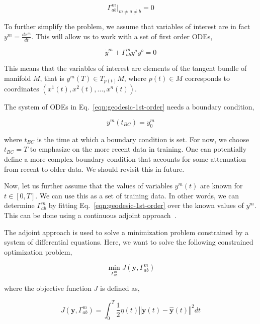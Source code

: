 \documentclass{article}
\begin{document}
\begin{equation}\label{eqn:gamma-diagonal-metric}
\Gamma^{m}_{ab}|_{m \ne a \ne b} = 0
\end{equation}

To further simplify the problem, we assume that variables of interest
are in fact $y^{m} = \frac{dx^{m}}{dt}$. This will allow us to work
with a set of first order ODEs,

\begin{equation}\label{eqn:geodesic-1st-order}
\dot{y}^{m} + \Gamma^{m}_{ab} y^{a} y^{b} = 0
\end{equation}

This means that the variables of interest are elements of the tangent
bundle of manifold $M$, that is $y^{m}(T) \in T_{p(t)}M$, where $p(t)
\in M$ corresponds to coordinates $(x^{1}(t),x^{2}(t),...,x^{n}(t))$.

The system of ODEs in Eq.~\ref{eqn:geodesic-1st-order} needs a
boundary condition,

\begin{equation}\label{eqn:geodesic-bc}
y^{m}(t_{BC}) = y^{m}_{0}
\end{equation}

where $t_{BC}$ is the time at which a boundary condition is set. For
now, we choose $t_{BC} = T$ to emphasize on the more recent data in
training. One can potentially define a more complex boundary condition
that accounts for some attenuation from recent to older data. We
should revisit this in future.

Now, let us further assume that the values of variables $y^{m}(t)$ are
known for $t \in [0,T]$. We can use this as a set of training data. In
other words, we can determine $\Gamma^{m}_{ab}$ by fitting
Eq.~\ref{eqn:geodesic-1st-order} over the known values of
$y^{m}$. This can be done using a continuous adjoint
approach~\cite{ref:adjoint-giles}.

The adjoint approach is used to solve a minimization problem
constrained by a system of differential equations. Here, we want to
solve the following constrained optimization problem,

\begin{equation}\label{eqn:optimization-problem}
\min_{\Gamma^{m}_{ab}} J(\boldsymbol{y},\Gamma^{m}_{ab})
\end{equation}

where the objective function $J$ is defined as,

\begin{equation}\label{eqn:optimization-objective-raw}
J(\boldsymbol{y},\Gamma^{m}_{ab}) = \int_{0}^{T} \frac{1}{2} \eta(t)
\left\Vert \boldsymbol{y}(t) - \hat{\boldsymbol{y}}(t) \right\Vert^{2}
dt
\end{equation}
\end{document}
